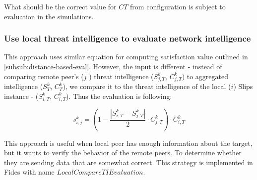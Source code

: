 \noindent What should be the correct value for $CT$ from configuration is subject to evaluation in the simulations.

\subsubsection{Use local threat intelligence to evaluate network intelligence}
This approach uses similar equation for computing satisfaction value outlined in \ref{subsub:distance-based-eval}. However, the input is different - instead of comparing remote peer's ($j$ ) threat intelligence ($S^{k}_{j, T}$, $C^{k}_{j, T}$) to aggregated intelligence ($S^{k}_{T}$, $C^{k}_{T}$), we compare it to the threat intelligence of the local ($i$) Slips instance - ($S^{k}_{i, T}$, $C^{k}_{i, T}$). Thus the evaluation is following:

\begin{equation}
s^{k}_{i, j} = (1 - \frac{|{S}^{k}_{i, T} - S^{k}_{j, T}|}{2} \cdot C^{k}_{j, T}) \cdot C^{k}_{i, T}
\end{equation}

This approach is useful when local peer has enough information about the target, but it wants to verify the behavior of the remote peers. To determine whether they are sending data that are somewhat correct. This strategy is implemented in Fides with name $LocalCompareTIEvaluation$.
